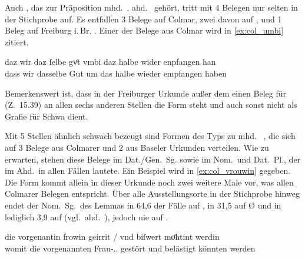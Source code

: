 Auch  , das zur Präposition mhd.~,
ahd.~ gehört, tritt mit 4 Belegen nur selten in der Stichprobe auf.
Es entfallen 3 Belege auf Colmar, zwei davon auf
 \autocites(Colmar, 1264){cao5}, und 1 Beleg auf
Freiburg i.\,Br. \autocites(Freiburg i.\,Br., 1297)[\pno~2580]{cao4}. Einer der
Belege aus Colmar wird in \cref{ex:col_umbi} zitiert.

\begin{exe}
\ex\label{ex:col_umbi}
	\gll daz wir {daz ſelbe} gvͦt vmbi daz halbe wider enpfangen han \\
		dass wir dasselbe Gut um das halbe wieder empfangen haben \\
	\begin{taggedline}{\autocites(Colmar, 1269)[\pno~N~92, 64.27--28]{cao5}}
	\trans {}
	\end{taggedline}
\end{exe}

Bemerkenswert ist, dass in der Freiburger Urkunde 
außer dem einen Beleg für   (Z.~15.39) an allen sechs
anderen Stellen die Form  steht und  auch sonst nicht als
Grafie für Schwa dient.

Mit 5 Stellen ähnlich schwach bezeugt sind Formen des Typs  zu
mhd.~ , die sich auf 3 Belege aus
Colmarer und 2 aus Baseler Urkunden verteilen. Wie zu erwarten, stehen diese
Belege im Dat./Gen.~Sg. sowie im Nom.\ und Dat.~Pl., der im Ahd.\ in allen
Fällen  lautete. Ein Beispiel wird in \cref{ex:col_vrouwin}
gegeben. Die Form kommt allein in dieser Urkunde noch zwei weitere Male vor,
was allen Colmarer Belegen entspricht. Über alle Ausstellungsorte in der
Stichprobe hinweg endet der Nom.~Sg.\ des Lemmas 
 in 64,6\pct{} der Fälle auf , in 31,5\pct{} auf Ø
und in lediglich 3,9\pct{} auf  (vgl.~ahd.~), jedoch nie
auf .

\begin{exe}
\ex\label{ex:col_vrouwin}
	 die vorgenantin frowin geirrit / vnd biſwert
			moͤhtint werdin \\
		womit die vorgenannten Frau-\Nom.\Pl.\FemF{} gestört {} und belästigt
			könnten werden \\
	\begin{taggedline}{\autocites(Colmar, 1299)[\pno~3293, 446.24]{cao4}}
	\trans {}
	\end{taggedline}
\end{exe}

